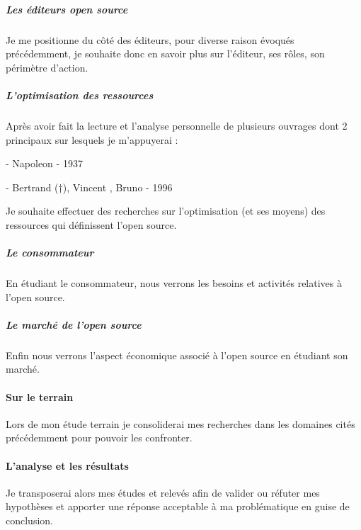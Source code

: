 			\subparagraph{Les éditeurs open source\\}

				Je me positionne du côté des éditeurs, pour diverse raison évoqués précédemment, je souhaite donc en savoir plus sur l'éditeur, ses rôles, son périmètre d'action.

			\subparagraph{L'optimisation des ressources\\}
		
				Après avoir fait la lecture et l'analyse personnelle de plusieurs ouvrages dont 2 principaux sur lesquels je m'appuyerai : 
		
				\begin{displayquote}
					 - Napoleon  - 1937
				\end{displayquote}
				\begin{displayquote}
					 - Bertrand  (†), Vincent , Bruno \bsc{Jarrosson} - 1996
				\end{displayquote}
		
				Je souhaite effectuer des recherches sur l'optimisation (et ses moyens) des ressources qui définissent l'open source.

			\subparagraph{Le consommateur\\}
				En étudiant le consommateur, nous verrons les besoins et activités relatives à l'open source.

			\subparagraph{Le marché de l'open source\\}
				Enfin nous verrons l'aspect économique associé à l'open source en étudiant son marché.

		\paragraph{Sur le terrain \\}
			Lors de mon étude terrain je consoliderai mes recherches dans les domaines cités précédemment pour pouvoir les confronter.

		\paragraph{L'analyse et les résultats \\}
			Je transposerai alors mes études et relevés afin de valider ou réfuter mes hypothèses et apporter une réponse acceptable à ma problématique en guise de conclusion.